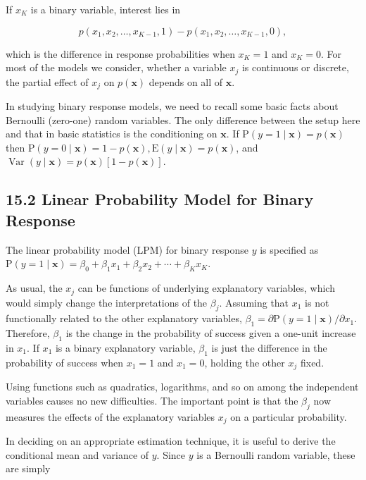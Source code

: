 \documentclass[10pt]{article}
\begin{document}
If $x_{K}$ is a binary variable, interest lies in


\begin{equation*}
p\left(x_{1}, x_{2}, \ldots, x_{K-1}, 1\right)-p\left(x_{1}, x_{2}, \ldots, x_{K-1}, 0\right), \tag{15.3}
\end{equation*}


which is the difference in response probabilities when $x_{K}=1$ and $x_{K}=0$. For most of the models we consider, whether a variable $x_{j}$ is continuous or discrete, the partial effect of $x_{j}$ on $p(\mathbf{x})$ depends on all of $\mathbf{x}$.

In studying binary response models, we need to recall some basic facts about Bernoulli (zero-one) random variables. The only difference between the setup here and that in basic statistics is the conditioning on $\mathbf{x}$. If $\mathrm{P}(y=1 \mid \mathbf{x})=p(\mathbf{x})$ then $\mathrm{P}(y=0 \mid \mathbf{x})=1-p(\mathbf{x}), \mathrm{E}(y \mid \mathbf{x})=p(\mathbf{x})$, and $\operatorname{Var}(y \mid \mathbf{x})=p(\mathbf{x})[1-p(\mathbf{x})]$.

\subsection*{15.2 Linear Probability Model for Binary Response}
The linear probability model (LPM) for binary response $y$ is specified as\\
$\mathrm{P}(y=1 \mid \mathbf{x})=\beta_{0}+\beta_{1} x_{1}+\beta_{2} x_{2}+\cdots+\beta_{K} x_{K}$.

As usual, the $x_{j}$ can be functions of underlying explanatory variables, which would simply change the interpretations of the $\beta_{j}$. Assuming that $x_{1}$ is not functionally related to the other explanatory variables, $\beta_{1}=\partial \mathrm{P}(y=1 \mid \mathbf{x}) / \partial x_{1}$. Therefore, $\beta_{1}$ is the change in the probability of success given a one-unit increase in $x_{1}$. If $x_{1}$ is a binary explanatory variable, $\beta_{1}$ is just the difference in the probability of success when $x_{1}=1$ and $x_{1}=0$, holding the other $x_{j}$ fixed.

Using functions such as quadratics, logarithms, and so on among the independent variables causes no new difficulties. The important point is that the $\beta_{j}$ now measures the effects of the explanatory variables $x_{j}$ on a particular probability.

In deciding on an appropriate estimation technique, it is useful to derive the conditional mean and variance of $y$. Since $y$ is a Bernoulli random variable, these are simply
\end{document}
